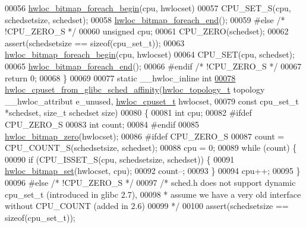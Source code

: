 \begin{DoxyCode}
00056   \hyperlink{a00065_ga3f6861045a8029ade373510ffa727d2a}{hwloc_bitmap_foreach_begin}(cpu, hwlocset)
00057     CPU\_SET\_S(cpu, schedsetsize, schedset);
00058   \hyperlink{a00065_gafcf3246db406218d4e155735b3fa6528}{hwloc_bitmap_foreach_end}();
00059 \textcolor{preprocessor}{#else }\textcolor{comment}{/* !CPU\_ZERO\_S */}
00060   \textcolor{keywordtype}{unsigned} cpu;
00061   CPU\_ZERO(schedset);
00062   assert(schedsetsize == \textcolor{keyword}{sizeof}(cpu\_set\_t));
00063   \hyperlink{a00065_ga3f6861045a8029ade373510ffa727d2a}{hwloc_bitmap_foreach_begin}(cpu, hwlocset)
00064     CPU\_SET(cpu, schedset);
00065   \hyperlink{a00065_gafcf3246db406218d4e155735b3fa6528}{hwloc_bitmap_foreach_end}();
00066 \textcolor{preprocessor}{#endif }\textcolor{comment}{/* !CPU\_ZERO\_S */}
00067   \textcolor{keywordflow}{return} 0;
00068 \}
00069 
00077 \textcolor{keyword}{static} \_\_hwloc\_inline \textcolor{keywordtype}{int}
\hypertarget{a00030_source_l00078}{}\hyperlink{a00066_ga6df504b2f5440b527be05cdad6b1655e}{00078} \hyperlink{a00066_ga6df504b2f5440b527be05cdad6b1655e}{hwloc_cpuset_from_glibc_sched_affinity}(\hyperlink{a00039_ga9d1e76ee15a7dee158b786c30b6a6e38}{hwloc_topology_t} topology \_\_hwloc\_attribut
      e\_unused, \hyperlink{a00040_ga4bbf39b68b6f568fb92739e7c0ea7801}{hwloc_cpuset_t} hwlocset,
00079                                        \textcolor{keyword}{const} cpu\_set\_t *schedset, \textcolor{keywordtype}{size\_t} schedset
      size)
00080 \{
00081   \textcolor{keywordtype}{int} cpu;
00082 \textcolor{preprocessor}{#ifdef CPU\_ZERO\_S}
00083 \textcolor{preprocessor}{}  \textcolor{keywordtype}{int} count;
00084 \textcolor{preprocessor}{#endif}
00085 \textcolor{preprocessor}{}  \hyperlink{a00065_ga6c540b9fe63b8223b6aba46d56dd63b8}{hwloc_bitmap_zero}(hwlocset);
00086 \textcolor{preprocessor}{#ifdef CPU\_ZERO\_S}
00087 \textcolor{preprocessor}{}  count = CPU\_COUNT\_S(schedsetsize, schedset);
00088   cpu = 0;
00089   \textcolor{keywordflow}{while} (count) \{
00090     \textcolor{keywordflow}{if} (CPU\_ISSET\_S(cpu, schedsetsize, schedset)) \{
00091       \hyperlink{a00065_ga497556af0cc34f109ae0277999c074d3}{hwloc_bitmap_set}(hwlocset, cpu);
00092       count--;
00093     \}
00094     cpu++;
00095   \}
00096 \textcolor{preprocessor}{#else }\textcolor{comment}{/* !CPU\_ZERO\_S */}
00097   \textcolor{comment}{/* sched.h does not support dynamic cpu\_set\_t (introduced in glibc 2.7),}
00098 \textcolor{comment}{   * assume we have a very old interface without CPU\_COUNT (added in 2.6)}
00099 \textcolor{comment}{   */}
00100   assert(schedsetsize == \textcolor{keyword}{sizeof}(cpu\_set\_t));

\end{DoxyCode}
